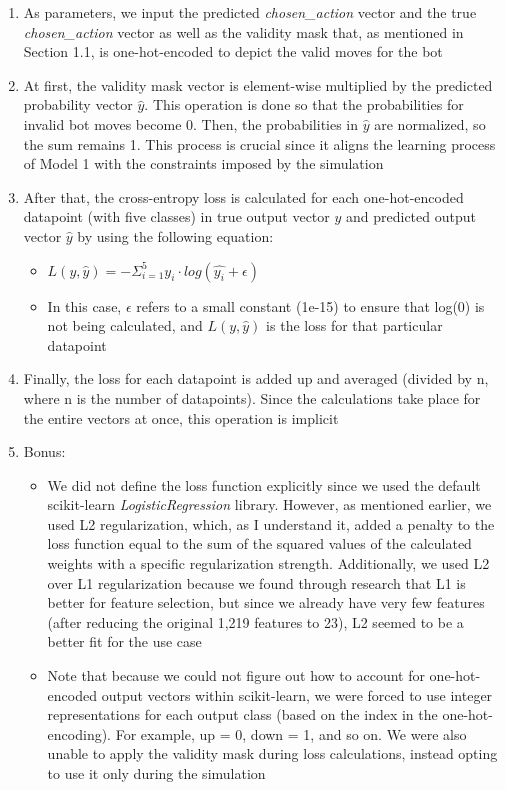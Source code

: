 \documentclass[11pt]{article}
\begin{document}
\begin{enumerate}
    \item As parameters, we input the predicted \emph{chosen\_action} vector and the true \emph{chosen\_action} vector as well as the validity mask that, as mentioned in Section 1.1, is one-hot-encoded to depict the valid moves for the bot
    \item At first, the validity mask vector is element-wise multiplied by the predicted probability vector $\hat{y}$. This operation is done so that the probabilities for invalid bot moves become 0. Then, the probabilities in $\hat{y}$ are normalized, so the sum remains 1. This process is crucial since it aligns the learning process of Model 1 with the constraints imposed by the simulation
    \item After that, the cross-entropy loss is calculated for each one-hot-encoded datapoint (with five classes) in true output vector $y$ and predicted output vector $\hat{y}$ by using the following equation:
    \begin{itemize}
        \item $L(y, \hat{y}) = - \Sigma_{i=1}^{5} y_i \cdot log(\hat{y_i} + \epsilon)$
        \item In this case, $\epsilon$ refers to a small constant (1e-15) to ensure that log(0) is not being calculated, and $L(y,\hat{y})$ is the loss for that particular datapoint
    \end{itemize}
    \item Finally, the loss for each datapoint is added up and averaged (divided by n, where n is the number of datapoints). Since the calculations take place for the entire vectors at once, this operation is implicit
    \item Bonus:
    \begin{itemize}
        \item We did not define the loss function explicitly since we used the default scikit-learn \emph{LogisticRegression} library. However, as mentioned earlier, we used L2 regularization, which, as I understand it, added a penalty to the loss function equal to the sum of the squared values of the calculated weights with a specific regularization strength. Additionally, we used L2 over L1 regularization because we found through research that L1 is better for feature selection, but since we already have very few features (after reducing the original 1,219 features to 23), L2 seemed to be a better fit for the use case
        \item Note that because we could not figure out how to account for one-hot-encoded output vectors within scikit-learn, we were forced to use integer representations for each output class (based on the index in the one-hot-encoding). For example, up = 0, down = 1, and so on. We were also unable to apply the validity mask during loss calculations, instead opting to use it only during the simulation
    \end{itemize}
\end{enumerate}
\end{document}
